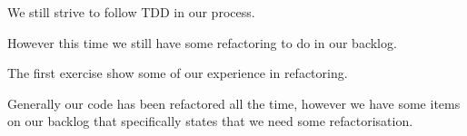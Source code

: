 We still strive to follow TDD in our process.
 
However this time we still have some refactoring to do in our backlog.

\label{backlog}

The first exercise  show some of our experience in refactoring.

Generally our code has been refactored all the time, however we have some items on our backlog that specifically states that we need some refactorisation.
